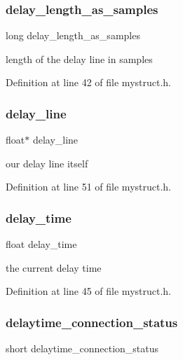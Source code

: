 \subsubsection{\texorpdfstring{delay\+\_\+length\+\_\+as\+\_\+samples}{delay\_length\_as\_samples}}
{\footnotesize\ttfamily long delay\+\_\+length\+\_\+as\+\_\+samples}

length of the delay line in samples 

Definition at line 42 of file mystruct.\+h.

\mbox{\label{struct__delaylama_a7f52f1f2e55bed198ee82896e6fae790}} 
\subsubsection{\texorpdfstring{delay\+\_\+line}{delay\_line}}
{\footnotesize\ttfamily float$\ast$ delay\+\_\+line}

our delay line itself 

Definition at line 51 of file mystruct.\+h.

\mbox{\label{struct__delaylama_a94508f45102f3baabfe745b83ff532a8}} 
\subsubsection{\texorpdfstring{delay\+\_\+time}{delay\_time}}
{\footnotesize\ttfamily float delay\+\_\+time}

the current delay time 

Definition at line 45 of file mystruct.\+h.

\mbox{\label{struct__delaylama_a00ecf1a566cefc76250b5b577a1fdc50}} 
\subsubsection{\texorpdfstring{delaytime\+\_\+connection\+\_\+status}{delaytime\_connection\_status}}
{\footnotesize\ttfamily short delaytime\+\_\+connection\+\_\+status}

